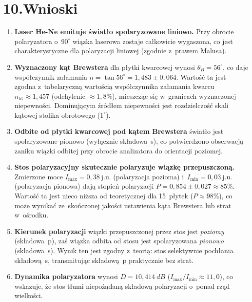 \documentclass[a4paper,12pt]{article}
\begin{document}
\section*{10.\quad Wnioski}

\begin{enumerate}

  \item \textbf{Laser He-Ne emituje światło spolaryzowane liniowo.}
        Przy obrocie polaryzatora o~$90^\circ$ wiązka laserowa zostaje całkowicie
        wygaszona, co jest charakterystyczne dla polaryzacji liniowej
        (zgodnie z~prawem Malusa).

  \item \textbf{Wyznaczony kąt Brewstera} dla płytki kwarcowej wynosi
        $\theta_B = 56^\circ$, co daje współczynnik załamania
        $n = \tan 56^\circ = 1{,}483 \pm 0{,}064$.
        Wartość ta jest zgodna z~tabelaryczną wartością współczynnika
        załamania kwarcu $n_{\text{lit}} \approx 1{,}457$
        (odchylenie $\approx 1{,}8\%$), mieszcząc się w~granicach
        wyznaczonej niepewności. Dominującym źródłem niepewności jest
        rozdzielczość skali kątowej stolika obrotowego (\(1^\circ\)).

  \item \textbf{Odbite od płytki kwarcowej pod kątem Brewstera}
        światło jest spolaryzowane pionowo (wyłącznie składowa~s),
        co potwierdzono obserwacją zaniku wiązki odbitej przy obrocie
        analizatora do orientacji poziomej.

  \item \textbf{Stos polaryzacyjny skutecznie polaryzuje wiązkę przepuszczoną.}
        Zmierzone moce $I_{\max} = 0{,}38\ \text{j.u.}$ (polaryzacja pozioma)
        i~$I_{\min} = 0{,}03\ \text{j.u.}$ (polaryzacja pionowa) dają stopień
        polaryzacji $P = 0{,}854 \pm 0{,}027 \approx 85\%$.
        Wartość ta jest nieco niższa od teoretycznej dla 15~płytek ($P \approx 98\%$),
        co może wynikać ze~skończonej jakości ustawienia kąta
        Brewstera lub strat w~ośrodku.

  \item \textbf{Kierunek polaryzacji} wiązki przepuszczonej przez stos jest
        \emph{poziomy} (składowa~p), zaś wiązka odbita od stosu jest
        spolaryzowana \emph{pionowo} (składowa~s). Wynik ten jest zgodny z~teorią:
        stos selektywnie pochłania składową~s, transmitując składową~p praktycznie
        bez strat.

  \item \textbf{Dynamika polaryzatora} wynosi $D = 10{,}414\ \si{dB}$
        ($I_{\max}/I_{\min} \approx 11{,}0$), co wskazuje, że stos tłumi
        niepożądaną składową polaryzacji o~ponad rząd wielkości.

\end{enumerate}
\end{document}
